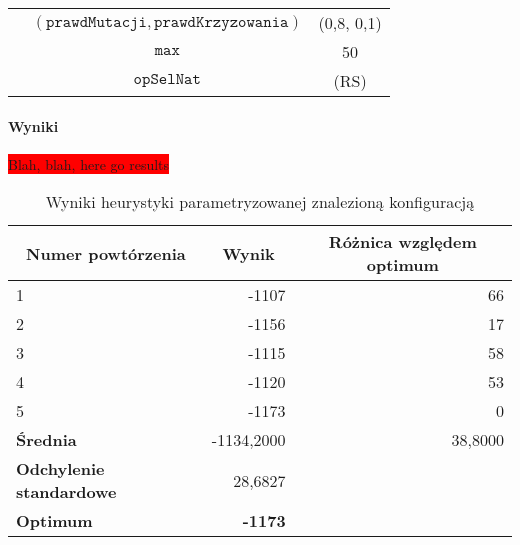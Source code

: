 \documentclass[twoside]{iisthesis}
\newcommand{\todo}{\colorbox{red}}
\newcommand{\param}[1]{\mathtt{#1}}
\newcommand{\opName}[1]{\textproc{#1}}
\begin{document}
\begin{table}[h]
\begin{tabular}{c|c|c|}
		\multicolumn{1}{|c|}{}                                & $(\param{prawdMutacji}, \param{prawdKrzyzowania})$ & (0,8, 0,1)              \\ \cline{2-3} 
		\multicolumn{1}{|c|}{}                                & $\param{max}$                                      & 50                     \\ \cline{2-3} 
		\multicolumn{1}{|c|}{}                                & $\param{opSelNat}$                                 & \opName{natSel}(RS)                \\ \hline
		
	\end{tabular}
\end{table}
%
\paragraph{Wyniki}

\todo{Blah, blah, here go results}

\begin{table}[h]
	\caption{Wyniki heurystyki parametryzowanej znalezioną konfiguracją \label{knapsack_init_results}}
	\begin{tabular}{|l|r|r}
		\hline
		\multicolumn{1}{|c|}{{\bf Numer powtórzenia}} & \multicolumn{1}{c|}{{\bf Wynik}} & \multicolumn{1}{c|}{{\bf Różnica względem optimum}} \\ \hline \hline
		1                                             & -1107                            & \multicolumn{1}{r|}{66}                             \\ \hline
		2                                             & -1156                            & \multicolumn{1}{r|}{17}                             \\ \hline
		3                                             & -1115                            & \multicolumn{1}{r|}{58}                             \\ \hline
		4                                             & -1120                            & \multicolumn{1}{r|}{53}                             \\ \hline
		5                                             & -1173                            & \multicolumn{1}{r|}{0}                              \\ \hline \hline
		{\bf Średnia}                                 & -1134,2000                          & \multicolumn{1}{r|}{38,8000}                           \\ \hline
		{\bf Odchylenie standardowe}                  & 28,6827                          & \multicolumn{1}{l}{}                                \\ \hhline{==~}
		{\bf Optimum}                                 & {\bf -1173}                      & \multicolumn{1}{l}{}                                \\ \cline{1-2}
	\end{tabular}
\end{table}
\end{document}
